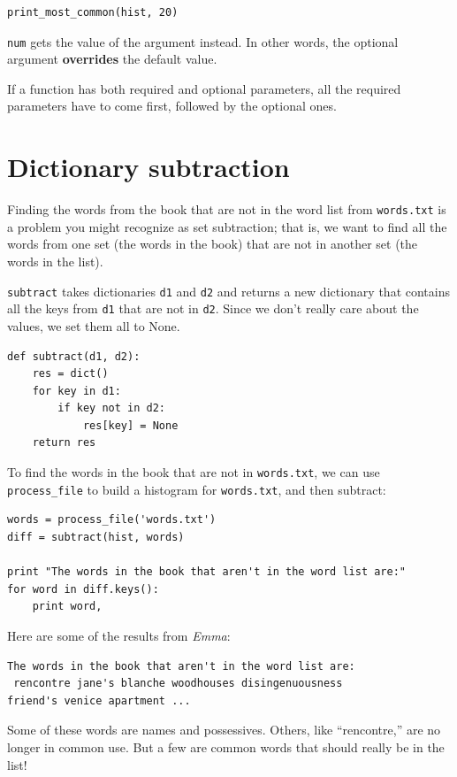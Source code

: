 \documentclass[10pt]{book}
\begin{document}
\beforeverb
\begin{verbatim}
print_most_common(hist, 20)
\end{verbatim}
\afterverb

{\tt num} gets the value of the argument instead.  In other
words, the optional argument {\bf overrides} the default value.


If a function has both required and optional parameters, all
the required parameters have to come first, followed by the
optional ones.


\section{Dictionary subtraction}


Finding the words from the book that are not in the word list
from {\tt words.txt} is a problem you might recognize as set
subtraction; that is, we want to find all the words from one
set (the words in the book) that are not in another set (the
words in the list).

{\tt subtract} takes dictionaries {\tt d1} and {\tt d2} and returns a
new dictionary that contains all the keys from {\tt d1} that are not
in {\tt d2}.  Since we don't really care about the values, we
set them all to None.

\beforeverb
\begin{verbatim}
def subtract(d1, d2):
    res = dict()
    for key in d1:
        if key not in d2:
            res[key] = None
    return res
\end{verbatim}
\afterverb
%
To find the words in the book that are not in {\tt words.txt},
we can use \verb"process_file" to build a histogram for
{\tt words.txt}, and then subtract:

\beforeverb
\begin{verbatim}
words = process_file('words.txt')
diff = subtract(hist, words)

print "The words in the book that aren't in the word list are:"
for word in diff.keys():
    print word,
\end{verbatim}
\afterverb
%
Here are some of the results from {\em Emma}:

\beforeverb
\begin{verbatim}
The words in the book that aren't in the word list are:
 rencontre jane's blanche woodhouses disingenuousness 
friend's venice apartment ...
\end{verbatim}
\afterverb
%
Some of these words are names and possessives.  Others, like
``rencontre,'' are no longer in common use.  But a few are common
words that should really be in the list!
\end{document}

